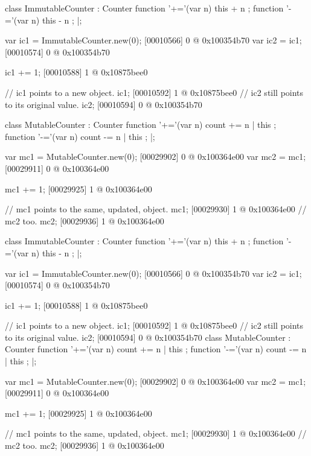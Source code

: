 \documentclass[openright,twoside,11pt]{book}
\begin{document}
\noindent
\begin{minipage}[t]{.48\linewidth}
\begin{urbiscript}[xrightmargin=0mm,xleftmargin=0mm]
class ImmutableCounter : Counter
{
  function '+='(var n) { this + n };
  function '-='(var n) { this - n };
}|;

var ic1 = ImmutableCounter.new(0);
[00010566] 0 @ 0x100354b70
var ic2 = ic1;
[00010574] 0 @ 0x100354b70

ic1 += 1;
[00010588] 1 @ 0x10875bee0

// ic1 points to a new object.
ic1;
[00010592] 1 @ 0x10875bee0
// ic2 still points to its original value.
ic2;
[00010594] 0 @ 0x100354b70
\end{urbiscript}
\end{minipage}
\hfill
\begin{minipage}[t]{.48\linewidth}
\begin{urbiscript}[xrightmargin=0mm,xleftmargin=0mm]
class MutableCounter : Counter
{
  function '+='(var n) { count += n | this };
  function '-='(var n) { count -= n | this };
}|;

var mc1 = MutableCounter.new(0);
[00029902] 0 @ 0x100364e00
var mc2 = mc1;
[00029911] 0 @ 0x100364e00

mc1 += 1;
[00029925] 1 @ 0x100364e00

// mc1 points to the same, updated, object.
mc1;
[00029930] 1 @ 0x100364e00
// mc2 too.
mc2;
[00029936] 1 @ 0x100364e00
\end{urbiscript}
\end{minipage}


\begin{urbiscript}[multicols=2]
class ImmutableCounter : Counter
{
  function '+='(var n) { this + n };
  function '-='(var n) { this - n };
}|;

var ic1 = ImmutableCounter.new(0);
[00010566] 0 @ 0x100354b70
var ic2 = ic1;
[00010574] 0 @ 0x100354b70

ic1 += 1;
[00010588] 1 @ 0x10875bee0

// ic1 points to a new object.
ic1;
[00010592] 1 @ 0x10875bee0
// ic2 still points to its original value.
ic2;
[00010594] 0 @ 0x100354b70
class MutableCounter : Counter
{
  function '+='(var n) { count += n | this };
  function '-='(var n) { count -= n | this };
}|;

var mc1 = MutableCounter.new(0);
[00029902] 0 @ 0x100364e00
var mc2 = mc1;
[00029911] 0 @ 0x100364e00

mc1 += 1;
[00029925] 1 @ 0x100364e00

// mc1 points to the same, updated, object.
mc1;
[00029930] 1 @ 0x100364e00
// mc2 too.
mc2;
[00029936] 1 @ 0x100364e00
\end{urbiscript}
\end{document}
